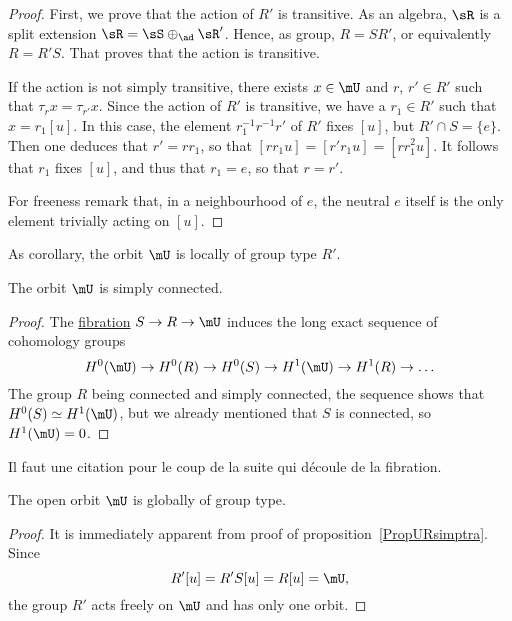 \begin{proof}

	First, we prove that the action of $R'$ is transitive. As an algebra, $\sR$ is a split extension $\sR=\sS\oplus_{\ad}\sR'$.  Hence, as group, $R=S R'$, or equivalently $R=R'S$. That proves that the action is transitive.

	If the action is not simply transitive, there exists $x\in\mU$ and $r$, $r'\in R'$ such that $\tau_rx=\tau_{r'}x$. Since the action of $R'$ is transitive, we have a $r_1\in R'$ such that $x=r_1[u]$. In this case, the element $r_1^{-1}r^{-1}r'$ of $R'$ fixes $[u]$, but $R'\cap S=\{ e \}$. Then one deduces that $r'=rr_1$, so that $[rr_1u]=[r'r_1u]=[rr_1^2u]$. It follows that $r_1$ fixes $[u]$, and thus that $r_1=e$, so that $r=r'$.

	For freeness remark that, in a neighbourhood of $e$, the neutral $e$ itself is the only element trivially acting on $[u]$.

\end{proof}

As corollary, the orbit $\mU$ is locally of group type $R'$.

\begin{proposition}     \label{PropmUsimpl}
	The orbit $\mU$ is simply connected.
\end{proposition}

\begin{proof}
	The \href{http://en.wikipedia.org/wiki/Fibration}{fibration} $S\to R\to\mU$ induces the long exact sequence of cohomology groups
	\[
		H^{0}(\mU)\to H^{0}(R)\to H^{0}(S)\to H^{1}(\mU)\to H^{1}(R)\to\ldots
	\]
	The group $R$ being connected and simply connected, the sequence shows that $H^{0}(S)\simeq H^{1}(\mU)$, but we already mentioned that $S$ is connected, so $H^1(\mU)=0$.
\end{proof}

\begin{probleme}
	Il faut une citation pour le coup de la suite qui découle de la fibration.
	\label{ProbFibra}
\end{probleme}


\begin{corollary}
	The open orbit $\mU$ is globally of group type.
	\label{CormUgloGppasSym}
\end{corollary}

\begin{proof}
	It is immediately apparent from proof of proposition~\ref{PropURsimptra}. Since
	\[
		R'[u]=R'S[u]=R[u]=\mU,
	\]
	the group $R'$ acts freely on $\mU$ and has only one orbit.
\end{proof}

